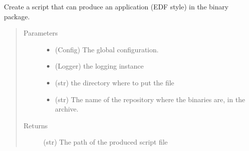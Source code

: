 \documentclass[a4paper,10pt,english]{sphinxmanual}
\begin{document}
\begin{fulllineitems}
\label{\detokenize{apidoc_commands/commands:commands.package.product_appli_creation_script}}
Create a script that can produce an application (EDF style) 
in the binary package.
\begin{quote}\begin{description}
\item[{Parameters}] \leavevmode\begin{itemize}
\item {} 
 \textendash{} (Config) The global configuration.

\item {} 
 \textendash{} (Logger) the logging instance

\item {} 
 \textendash{} (str) the directory where to put the file

\item {} 
 \textendash{} (str) 
The name of the repository where the binaries are, in the archive.

\end{itemize}

\item[{Returns}] \leavevmode
(str) The path of the produced script file

\end{description}\end{quote}

\end{fulllineitems}

\end{document}
